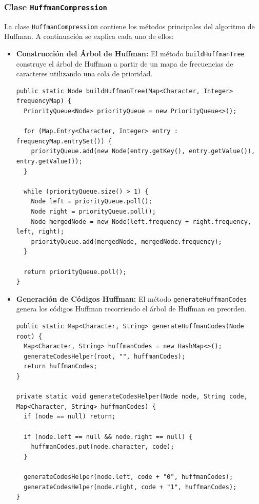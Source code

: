 \documentclass[10pt, a4paper]{article}
\newcommand{\mj}[1]{\texttt{#1}}
\begin{document}
\subsubsection{Clase \mj{HuffmanCompression}}

La clase \mj{HuffmanCompression} contiene los métodos principales del algoritmo de Huffman. A continuación se explica cada uno de ellos:

\begin{itemize}
  \item \textbf{Construcción del Árbol de Huffman:} El método \mj{buildHuffmanTree} construye el árbol de Huffman a partir de un mapa de frecuencias de caracteres utilizando una cola de prioridad.

\begin{verbatim}
public static Node buildHuffmanTree(Map<Character, Integer> frequencyMap) {
  PriorityQueue<Node> priorityQueue = new PriorityQueue<>();

  for (Map.Entry<Character, Integer> entry : frequencyMap.entrySet()) {
    priorityQueue.add(new Node(entry.getKey(), entry.getValue()), entry.getValue());
  }

  while (priorityQueue.size() > 1) {
    Node left = priorityQueue.poll();
    Node right = priorityQueue.poll();
    Node mergedNode = new Node(left.frequency + right.frequency, left, right);
    priorityQueue.add(mergedNode, mergedNode.frequency);
  }

  return priorityQueue.poll();
}
\end{verbatim}

  \item \textbf{Generación de Códigos Huffman:} El método \mj{generateHuffmanCodes} genera los códigos Huffman recorriendo el árbol de Huffman en preorden.

\begin{verbatim}
public static Map<Character, String> generateHuffmanCodes(Node root) {
  Map<Character, String> huffmanCodes = new HashMap<>();
  generateCodesHelper(root, "", huffmanCodes);
  return huffmanCodes;
}

private static void generateCodesHelper(Node node, String code, Map<Character, String> huffmanCodes) {
  if (node == null) return;

  if (node.left == null && node.right == null) {
    huffmanCodes.put(node.character, code);
  }

  generateCodesHelper(node.left, code + "0", huffmanCodes);
  generateCodesHelper(node.right, code + "1", huffmanCodes);
}
\end{verbatim}


\end{itemize}
\end{document}
